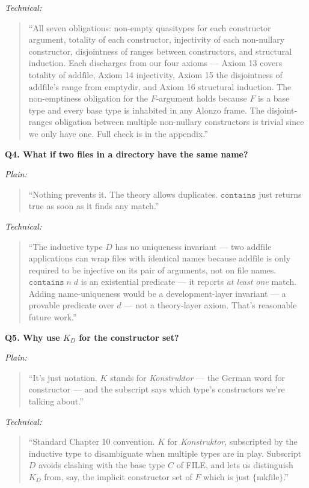 \documentclass[12pt]{article}
\newenvironment{say}{%
  \par\medskip%
  \begin{quote}%
  \setlength{\parskip}{0.7em}%
  \large\itshape%
}{%
  \end{quote}%
  \medskip%
}
\begin{document}
\textit{\color{pauseclr}Technical:}
\begin{say}
``All seven obligations: non-empty quasitypes for each constructor argument, totality of each constructor, injectivity of each non-nullary constructor, disjointness of ranges between constructors, and structural induction. Each discharges from our four axioms --- Axiom 13 covers totality of $\mathrm{addfile}$, Axiom 14 injectivity, Axiom 15 the disjointness of $\mathrm{addfile}$'s range from $\mathrm{emptydir}$, and Axiom 16 structural induction. The non-emptiness obligation for the $F$-argument holds because $F$ is a base type and every base type is inhabited in any Alonzo frame. The disjoint-ranges obligation between multiple non-nullary constructors is trivial since we only have one. Full check is in the appendix.''
\end{say}

\vspace{0.8em}
\textbf{\color{slidebar}Q4. What if two files in a directory have the same name?}

\textit{\color{pauseclr}Plain:}
\begin{say}
``Nothing prevents it. The theory allows duplicates. $\mathtt{contains}$ just returns true as soon as it finds any match.''
\end{say}

\textit{\color{pauseclr}Technical:}
\begin{say}
``The inductive type $D$ has no uniqueness invariant --- two $\mathrm{addfile}$ applications can wrap files with identical names because $\mathrm{addfile}$ is only required to be injective on its pair of arguments, not on file names. $\mathtt{contains}\; n\; d$ is an existential predicate --- it reports \emph{at least one} match. Adding name-uniqueness would be a development-layer invariant --- a provable predicate over $d$ --- not a theory-layer axiom. That's reasonable future work.''
\end{say}

\vspace{0.8em}
\textbf{\color{slidebar}Q5. Why use $K_D$ for the constructor set?}

\textit{\color{pauseclr}Plain:}
\begin{say}
``It's just notation. $K$ stands for \textit{Konstruktor} --- the German word for constructor --- and the subscript says which type's constructors we're talking about.''
\end{say}

\textit{\color{pauseclr}Technical:}
\begin{say}
``Standard Chapter 10 convention. $K$ for \textit{Konstruktor}, subscripted by the inductive type to disambiguate when multiple types are in play. Subscript $D$ avoids clashing with the base type $C$ of FILE, and lets us distinguish $K_D$ from, say, the implicit constructor set of $F$ which is just $\{\mathrm{mkfile}\}$.''
\end{say}
\end{document}

